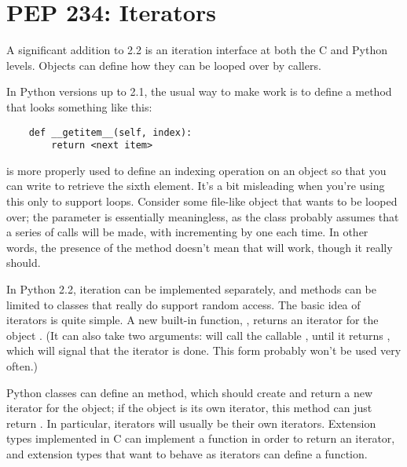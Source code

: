 \documentclass{howto}
\begin{document}
\section{PEP 234: Iterators}

A significant addition to 2.2 is an iteration interface at both the C
and Python levels.  Objects can define how they can be looped over by
callers.

In Python versions up to 2.1, the usual way to make  work is to define a  method that looks
something like this:

\begin{verbatim}
    def __getitem__(self, index):
        return <next item>
\end{verbatim}

 is more properly used to define an indexing
operation on an object so that you can write  to retrieve
the sixth element.  It's a bit misleading when you're using this only
to support  loops.  Consider some file-like object that
wants to be looped over; the  parameter is essentially
meaningless, as the class probably assumes that a series of
 calls will be made, with 
incrementing by one each time.  In other words, the presence of the
 method doesn't mean that  will
work, though it really should.

In Python 2.2, iteration can be implemented separately, and
 methods can be limited to classes that really
do support random access.  The basic idea of iterators is quite
simple.  A new built-in function, , returns an
iterator for the object .  (It can also take two arguments:
 will call the callable ,
until it returns , which will signal that the iterator
is done.  This form probably won't be used very often.)

Python classes can define an  method, which should
create and return a new iterator for the object; if the object is its
own iterator, this method can just return .  In particular,
iterators will usually be their own iterators.  Extension types
implemented in C can implement a  function in order to
return an iterator, and extension types that want to behave as
iterators can define a  function.
\end{document}
